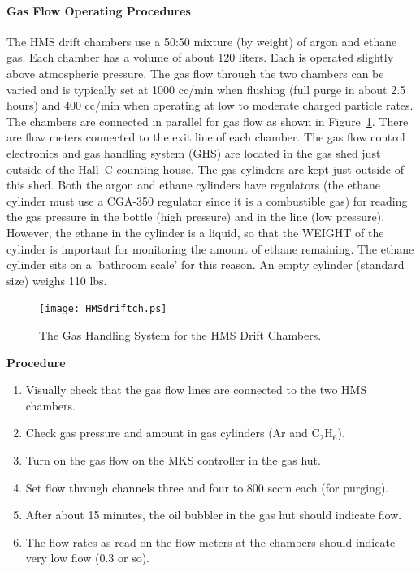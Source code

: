 \paragraph {Gas Flow Operating Procedures}

The HMS drift chambers use a 50:50 mixture (by weight) of argon and
ethane gas.  Each chamber has a volume of about 120 liters.  Each is
operated slightly above atmospheric pressure.  The gas flow through
the two chambers can be varied and is typically set at 1000 cc/min
when flushing (full purge in about 2.5 hours) and 400 cc/min when operating
at low to moderate charged particle rates.  The chambers are connected
in parallel for gas flow as shown in Figure~\ref{fig:5.1}.  There are flow meters 
connected
to the exit line of each chamber.  The gas flow control electronics
and gas handling system (GHS) are located in the gas shed just outside
of the Hall~C counting house.  The gas cylinders are kept just outside of
this shed.  Both the argon and ethane cylinders have regulators (the ethane
cylinder must use a CGA-350 regulator since it is a combustible gas) for
reading the gas pressure in the bottle (high pressure) and in the line (low
pressure).  However, the ethane
in the cylinder is a liquid, so that the WEIGHT of the cylinder is important
for monitoring the amount of ethane remaining.  The ethane
cylinder sits on a 'bathroom scale' for this reason.  An empty cylinder
(standard size) weighs 110 lbs.

\begin{figure}
\texttt{[image: HMSdriftch.ps]}
\caption{The Gas Handling System for the HMS Drift Chambers. \label{fig:5.1}}
\end{figure}

\begin{center}
{\bf Procedure}
\end{center}

\begin{enumerate}
\item {Visually check that the gas flow lines are connected to the two
HMS chambers.}
\item {Check gas pressure and amount in gas cylinders (Ar and C$_2$H$_6$).}
\item {Turn on the gas flow on the MKS controller in the gas hut.}
\item {Set flow through channels three and four to 800 sccm each
(for purging).}
\item {After about 15 minutes, the oil bubbler in the gas hut should
indicate flow.}
\item {The flow rates as read on the flow meters at the chambers should
indicate very low flow (0.3 or so).}
\end{enumerate}

